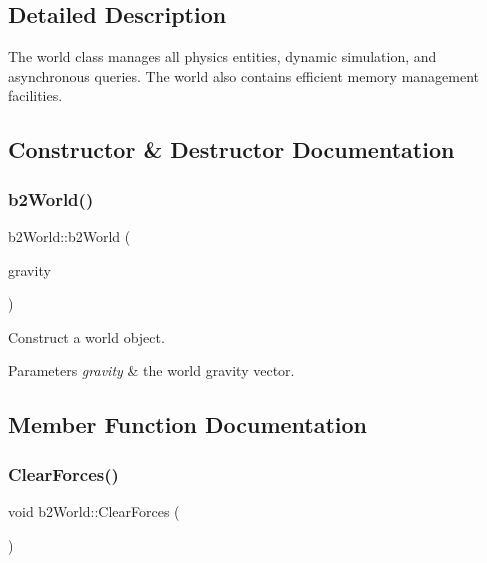 \subsection{Detailed Description}
The world class manages all physics entities, dynamic simulation, and asynchronous queries. The world also contains efficient memory management facilities. 

\subsection{Constructor \& Destructor Documentation}
\mbox{\label{classb2World_aeccc87fd9e36702c821a8244ca7cd875}} 
\subsubsection{\texorpdfstring{b2\+World()}{b2World()}}
{\footnotesize\ttfamily b2\+World\+::b2\+World (\begin{DoxyParamCaption}\item[{const \mbox{\hyperlink{structb2Vec2}{b2\+Vec2}} \&}]{gravity }\end{DoxyParamCaption})}

Construct a world object. 
\begin{DoxyParams}{Parameters}
{\em gravity} & the world gravity vector. \\
\hline
\end{DoxyParams}


\subsection{Member Function Documentation}
\mbox{\label{classb2World_ac082ab4c4ad0b1c5ec4674315eeec643}} 
\subsubsection{\texorpdfstring{Clear\+Forces()}{ClearForces()}}
{\footnotesize\ttfamily void b2\+World\+::\+Clear\+Forces (\begin{DoxyParamCaption}{ }\end{DoxyParamCaption})}

